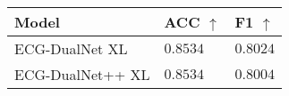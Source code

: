 \begin{tabular}{>{\raggedright\arraybackslash}p{}>{\raggedright\arraybackslash}p{}>{\raggedright\arraybackslash}p{}}
    \hline
	Model & ACC $\uparrow$ & F1 $\uparrow$ \\
	\hline
	ECG-DualNet XL & $0.8534$ & $0.8024$ \\
	ECG-DualNet++ XL & $0.8534$ & $0.8004$ \\
	\hline
\end{tabular}
